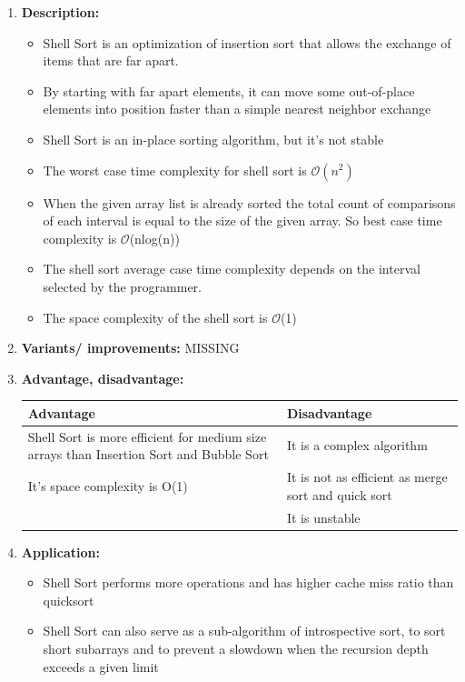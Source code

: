 \documentclass[11pt,a4paper]{article}
\begin{document}
{\begin{enumerate}[label=\textbf{\arabic*})]
				\item \textbf{Description:}
					\begin{itemize}
						\item Shell Sort is an optimization of insertion sort that allows the exchange of items that are far apart.
						\item By starting with far apart elements, it can move some out-of-place elements into position faster than a simple nearest neighbor exchange
						\item Shell Sort is an in-place sorting algorithm, but it’s not stable
						\item The worst case time complexity for shell sort is $\mathcal{O}(n^2)$
						\item When the given array list is already sorted the total count of comparisons of each interval is equal to the size of the given array. So best case time complexity is $\mathcal{O}$(nlog(n))
						\item The shell sort average case time complexity depends on the interval selected by the programmer.
						\item The space complexity of the shell sort is $\mathcal{O}$(1)
					\end{itemize}
				\item \textbf{Variants/ improvements:}
					MISSING
				\item \textbf{Advantage, disadvantage:}
					\begin{table}[H]
						\centering
						\begin{tabular}{|p{8cm}|p{8cm}|}
							\hline
							\textbf{Advantage} & \textbf{Disadvantage} \\
							\hline
							\hline
							Shell Sort is more efficient for medium size arrays than Insertion Sort and Bubble Sort & It is a complex algorithm \\[12pt]
							It’s space complexity is O(1)  & It is not as efficient as merge sort and quick sort\\[12pt]
							 & It is unstable\\
							\hline
						\end{tabular}
					\end{table}
				\item \textbf{Application:}	
					\begin{itemize}
						\item Shell Sort performs more operations and has higher cache miss ratio than quicksort
						\item Shell Sort can also serve as a sub-algorithm of introspective sort, to sort short subarrays and to prevent a slowdown when the recursion depth exceeds a given limit
					\end{itemize}
			\end{enumerate}
		
}
\end{document}
